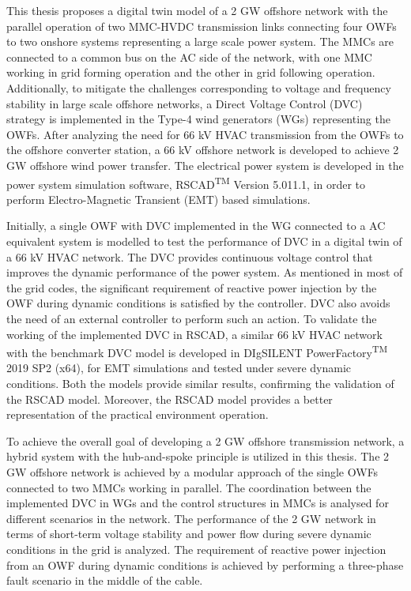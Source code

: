 This thesis proposes a digital twin model of a 2 GW offshore network with the parallel operation of two MMC-HVDC transmission links connecting four OWFs to two onshore systems representing a large scale power system. The MMCs are connected to a common bus on the AC side of the network, with one MMC working in grid forming operation and the other in grid following operation. Additionally, to mitigate the challenges corresponding to voltage and frequency stability in large scale offshore networks, a Direct Voltage Control (DVC) strategy is implemented in the Type-4 wind generators (WGs) representing the OWFs. After analyzing the need for 66 kV HVAC transmission from the OWFs to the offshore converter station, a 66 kV offshore network is developed to achieve 2 GW offshore wind power transfer. The electrical power system is developed in the power system simulation software, RSCAD\textsuperscript{TM} Version 5.011.1, in order to perform Electro-Magnetic Transient (EMT) based simulations. 

Initially, a single OWF with DVC implemented in the WG connected to a AC equivalent system is modelled to test the performance of DVC in a digital twin of a 66 kV HVAC network. The DVC provides continuous voltage control that improves the dynamic performance of the power system. As mentioned in most of the grid codes, the significant requirement of reactive power injection by the OWF during dynamic conditions is satisfied by the controller. DVC also avoids the need of an external controller to perform such an action. To validate the working of the implemented DVC in RSCAD, a similar 66 kV HVAC network with the benchmark DVC model is developed in DIgSILENT PowerFactory\textsuperscript{TM} 2019 SP2 (x64), for EMT simulations and tested under severe dynamic conditions. Both the models provide similar results, confirming the validation of the RSCAD model. Moreover, the RSCAD model provides a better representation of the practical environment operation. 

To achieve the overall goal of developing a 2 GW offshore transmission network, a hybrid system with the hub-and-spoke principle is utilized in this thesis. The 2 GW offshore network is achieved by a modular approach of the single OWFs connected to two MMCs working in parallel. The coordination between the implemented DVC in WGs and the control structures in MMCs is analysed for different scenarios in the network. The performance of the 2 GW network in terms of short-term voltage stability and power flow during severe dynamic conditions in the grid is analyzed. The requirement of reactive power injection from an OWF during dynamic conditions is achieved by performing a three-phase fault scenario in the middle of the cable. 
